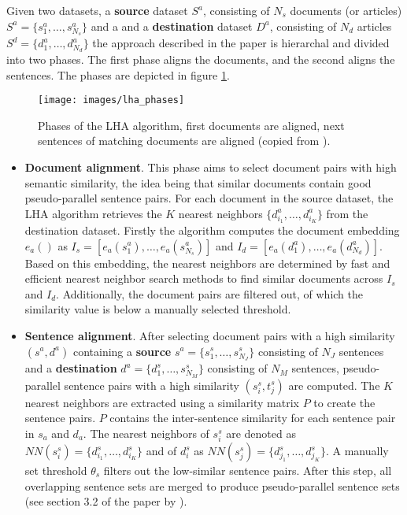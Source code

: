 Given two datasets, a \textbf{source} dataset $S^a$,  consisting of $N_s$ documents (or articles) $S^a = \{s^a_1, \ldots, s^a_{N_s}\}$ and a and a \textbf{destination} dataset $D^a$,  consisting of $N_d$ articles $S^d = \{d^a_1, \ldots, d^a_{N_d}\}$ the approach described in the paper is hierarchal and divided into two phases. The first phase aligns the documents, and the second aligns the sentences. The phases are depicted in figure \ref{imgLHAphasesOriginal}.

\begin{figure}[h]
\centering
\captionsetup{justification=centering}

\texttt{[image: images/lha\_phases]}
\caption{Phases of the LHA algorithm, first documents are aligned, next sentences of matching documents are aligned (copied from \citep{nikolov2018large}).}
\label{imgLHAphasesOriginal}
\end{figure}
\begin{itemize}
  \item{\textbf{Document alignment}}. This phase aims to select document pairs with high semantic similarity, the idea being that similar documents contain good pseudo-parallel sentence pairs. For each document in the source dataset, the LHA algorithm retrieves the $K$ nearest neighbors $\{d^a_{i_1}, \ldots, d^a_{i_K}\}$ from the destination dataset. Firstly the algorithm computes the document embedding $e_a()$ as $I_s = [e_a(s^a_1), \ldots, e_a(s^a_{N_s})]$ and $I_d = [e_a(d^a_1), \ldots, e_a(d^a_{N_d})]$. Based on this embedding, the nearest neighbors are determined by fast and efficient nearest neighbor search methods to find similar documents across $I_s$ and $I_d$. Additionally, the document pairs are filtered out, of which the similarity value is below a manually selected threshold. 
    \item{\textbf{Sentence alignment}}. After selecting document pairs with a high similarity $(s^a, d^a)$ containing a \textbf{source} $s^a = \{s^s_1, \ldots, s^s_{N_J}\}$ consisting of $N_J$ sentences and a \textbf{destination} $d^a = \{d^s_1, \ldots, s^s_{N_M}\}$ consisting of $N_M$ sentences, pseudo-parallel sentence pairs with a high similarity $(s^s_i, t^s_j)$ are computed.  The $K$ nearest neighbors are extracted using a similarity matrix $P$ to create the sentence pairs. $P$ contains the inter-sentence similarity for each sentence pair in $s_a$ and $d_a$. The nearest neighbors of $s^s_i$ are denoted as $NN(s^s_i) = \{d^s_{i_1}, \ldots,d^s_{i_K}\}$ and of $d^s_i$ as $NN(s^s_j) = \{d^s_{j_1}, \ldots,d^s_{j_K}\}$. A manually set threshold $\theta_s$ filters out the low-similar sentence pairs. After this step, all overlapping sentence sets are merged to produce pseudo-parallel sentence sets (see section 3.2 of the paper by \citet{nikolov2018large}).
\end{itemize}

